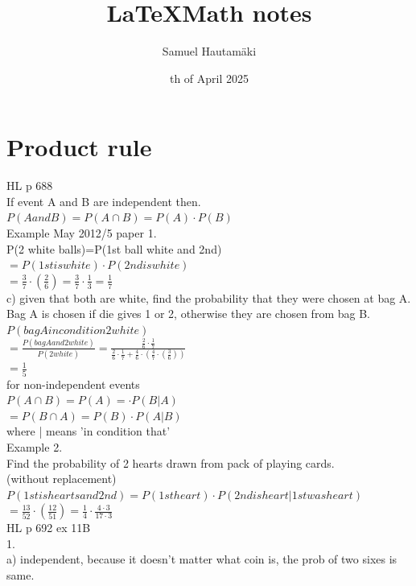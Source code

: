 \documentclass{article}
\title{\LaTeX Math notes}
\author{Samuel Hautamäki}
\date{th of April 2025}
\begin{document}
  \maketitle
   
  \section{Product rule}
  HL p 688\\
  If event A and B are independent then.\\
  $P(A and B)=P(A\cap B)=P(A)\cdot P(B)$\\
  Example May 2012/5 paper 1.\\
  P(2 white balls)=P(1st ball white and 2nd)\\
  $=P(1st is white)\cdot P(2nd is white)$\\
  $=\frac{3}{7}\cdot(\frac{2}{6})=\frac{3}{7}\cdot\frac{1}{3}=\frac{1}{7}$\\
  c) given that both are white, find the probability that they were chosen at bag A.\\
  Bag A is chosen if die gives 1 or 2, otherwise they are chosen from bag B.\\
  $P(bag A in condition 2 white)$\\
  $=\frac{P(bag A and 2 white)}{P(2 white)}=\frac{\frac{2}{6}\cdot\frac{1}{7}}{\frac{2}{6}\cdot\frac{1}{7}+\frac{4}{6}\cdot(\frac{4}{7}\cdot(\frac{3}{6}))}$\\
  $=\frac{1}{5}$\\
  for non-independent events\\
  $P(A\cap B)=P(A)=\cdot P(B|A)$\\
  $=P(B\cap A)=P(B)\cdot P(A|B)$\\
  where | means 'in condition that'\\
  Example 2.\\
  Find the probability of 2 hearts drawn from pack of playing cards.\\
  (without replacement)\\
  $P(1st is hearts and 2nd)=P(1st heart)\cdot P(2nd is heart| 1st was heart)$\\
  $=\frac{13}{52}\cdot(\frac{12}{51})=\frac{1}{4}\cdot\frac{4\cdot 3}{17\cdot 3}$\\
  HL p 692 ex 11B\\
  1. \\
  a) independent, because it doesn't matter what coin is, the prob of two sixes is same.\\
\end{document}
